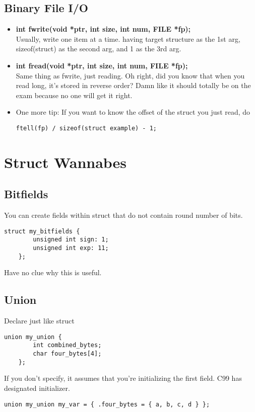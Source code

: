\documentclass{article}
\begin{document}
\subsection{Binary File I/O}
\begin{itemize}
    \item \textbf{int fwrite(void *ptr, int size, int num, FILE *fp);}\\
    Usually, write one item at a time. having target structure as the 1st arg, sizeof(struct) as the second arg, and 1 as the 3rd arg.
    \item \textbf{int fread(void *ptr, int size, int num, FILE *fp);}\\
    Same thing as fwrite, just reading. Oh right, did you know that when you read long, it's stored in reverse order? Damn like it should totally be on the exam because no one will get it right.
    \item One more tip: If you want to know the offset of the struct you just read, do
    \begin{lstlisting}[style=CStyle]
        ftell(fp) / sizeof(struct example) - 1;
    \end{lstlisting}
\end{itemize}

\section{Struct Wannabes}

\subsection{Bitfields}
You can create fields within struct that do not contain round number of bits.
\begin{lstlisting}[style=CStyle]
    struct my_bitfields {
        unsigned int sign: 1;
        unsigned int exp: 11;
    };
\end{lstlisting}
Have no clue why this is useful.

\subsection{Union}
Declare just like struct
\begin{lstlisting}[style=CStyle]
    union my_union {
        int combined_bytes;
        char four_bytes[4];
    };
\end{lstlisting}
If you don't specify, it assumes that you're initializing the first field. C99 has designated initializer. 
\begin{lstlisting}[style=CStyle]
    union my_union my_var = { .four_bytes = { a, b, c, d } };
\end{lstlisting}
\end{document}
